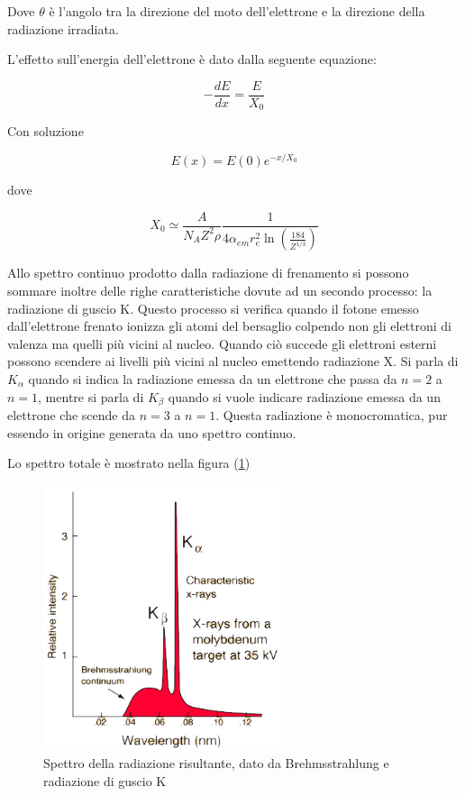 Dove $\theta$ è l'angolo tra la direzione del moto dell'elettrone e la direzione della radiazione irradiata.

L'effetto sull'energia dell'elettrone è dato dalla seguente equazione:

\begin{equation}
-\frac{dE}{dx}=\frac{E}{X_0}
\end{equation}

Con soluzione

\begin{equation}
E(x)=E(0)e^{-x/X_0}
\end{equation}

dove 

\begin{equation}
X_0\simeq\frac{A}{N_A Z^2 \rho}\frac{1}{4 \alpha_{em}r_e^2 \ln(\frac{184}{Z^{1/3}})}
\end{equation}

Allo spettro continuo prodotto dalla radiazione di frenamento si possono sommare inoltre delle righe caratteristiche dovute ad un secondo processo: la radiazione di guscio K. 
Questo processo si verifica quando il fotone emesso dall'elettrone frenato ionizza gli atomi del bersaglio colpendo non gli elettroni di valenza ma quelli più vicini al nucleo. Quando ciò succede gli elettroni esterni possono scendere ai livelli più vicini al nucleo emettendo radiazione X. Si parla di $K_{\alpha}$ quando si indica la radiazione emessa da un elettrone che passa da $n=2$ a $n=1$, mentre si parla di $K_{\beta}$ quando si vuole indicare radiazione emessa da un elettrone che scende da $n=3$ a $n=1$. Questa radiazione è monocromatica, pur essendo in origine generata da uno spettro continuo.

Lo spettro totale è mostrato nella figura (\ref{brehmspect})

\begin{figure}
\centering
		\includegraphics[width=7cm, keepaspectratio]{figs/Spettroxrays.png}
		\caption{Spettro della radiazione risultante, dato da Brehmsstrahlung e radiazione di guscio K}
         \label{brehmspect}
\end{figure}

